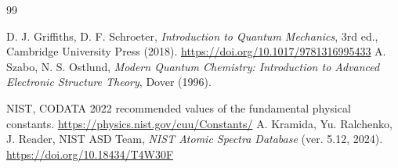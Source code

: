 \renewcommand{\bibname}{Tài liệu trích dẫn}
\clearpage
{}
{}
{\small
\begin{thebibliography}{99}
\setlength{\itemsep}{2pt}

 D. J. Griffiths, D. F. Schroeter, \emph{Introduction to Quantum Mechanics}, 3rd ed., Cambridge University Press (2018). \url{https://doi.org/10.1017/9781316995433}
 A. Szabo, N. S. Ostlund, \emph{Modern Quantum Chemistry: Introduction to Advanced Electronic Structure Theory}, Dover (1996).

 NIST, CODATA 2022 recommended values of the fundamental physical constants. \url{https://physics.nist.gov/cuu/Constants/}
 A. Kramida, Yu. Ralchenko, J. Reader, NIST ASD Team, \emph{NIST Atomic Spectra Database} (ver. 5.12, 2024). \url{https://doi.org/10.18434/T4W30F}


\end{thebibliography}}
